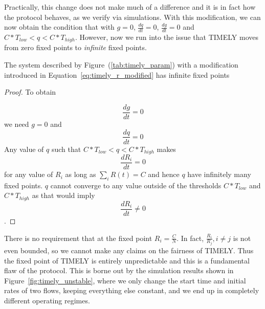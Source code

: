 Practically, this change does not make much of a difference and it is
in fact how the protocol behaves, as we verify via simulations. With this
modification, we can now obtain the condition that with $g =0$, $\tfrac{dq}{dt}
= 0$, $\tfrac{dg}{dt} = 0$ and $C*T_{low} < q < C*T_{high}$. However, now we run
into the issue that TIMELY moves from zero fixed points to \emph{infinite} fixed
points.
\begin{thm}
The system described by Figure~(\ref{tab:timely_param}) with a
modification introduced in Equation~\ref{eq:timely_r_modified} has
infinite fixed points
\end{thm}
\begin{proof}
 To obtain 

$$\frac{dg}{dt} =0$$ we need $g = 0$ and
$$\frac{dq}{dt} = 0$$ Any value of $q$ such that $C*T_{low} < q <
C*T_{high}$ makes $$\frac{dR_i}{dt} = 0$$ for any value of $R_i$ as
long as $\sum_{i} R(t) =  C$ and hence $q$ have infinitely many fixed
points. 
$q$ cannot converge to any value outside of the
thresholds $ C*{T_{low}}$ and $C*{T_{high}}$ as that would
imply $$\frac{dR_i}{dt} \ne 0$$.
\end{proof}
There is no requirement that at the fixed point $R_i = \tfrac{C}{N}$. In
fact, $\tfrac{R_{i}}{R_{j}}, i \ne j$ is not even bounded, so we cannot make any
claims on the fairness of TIMELY. Thus the fixed point of TIMELY is entirely
unpredictable and this is a fundamental flaw of the protocol. This is borne out
by the simulation results shown in Figure~\ref{fig:timely_unstable}, where we
only change the start time and initial rates of two flows, keeping everything
else constant, and we end up in completely different operating regimes.


